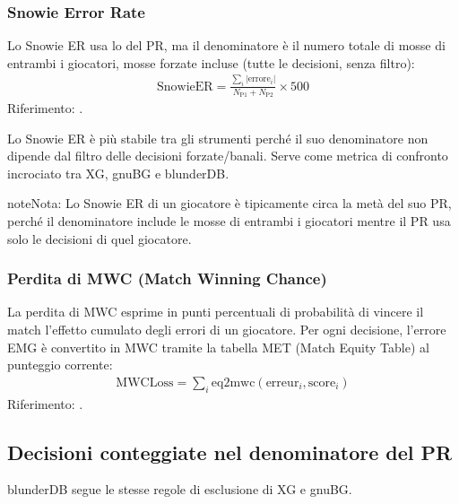 \documentclass[letterpaper,10pt,italian]{sphinxmanual}
\begin{document}
\subsubsection{Snowie Error Rate}
\label{\detokenize{stats_parity:snowie-error-rate}}
\sphinxAtStartPar
Lo Snowie ER usa lo  del PR, ma il denominatore è il numero totale di mosse di entrambi i giocatori, mosse forzate incluse (tutte le decisioni, senza filtro):
\begin{equation*}
\begin{split}\mathrm{SnowieER} = \frac{\sum_i |\mathrm{errore}_i|}{N_\text{P1} + N_\text{P2}} \times 500\end{split}
\end{equation*}
\sphinxAtStartPar
Riferimento: .

\sphinxAtStartPar
Lo Snowie ER è più stabile tra gli strumenti perché il suo denominatore non dipende dal filtro delle decisioni forzate/banali. Serve come metrica di confronto incrociato tra XG, gnuBG e blunderDB.

\begin{sphinxadmonition}{note}{Nota:}
\sphinxAtStartPar
Lo Snowie ER di un giocatore è tipicamente circa la metà del suo PR, perché il denominatore include le mosse di entrambi i giocatori mentre il PR usa solo le decisioni di quel giocatore.
\end{sphinxadmonition}


\subsubsection{Perdita di MWC (Match Winning Chance)}
\label{\detokenize{stats_parity:perte-mwc-match-winning-chance}}
\sphinxAtStartPar
La perdita di MWC esprime in punti percentuali di probabilità di vincere il match l’effetto cumulato degli errori di un giocatore. Per ogni decisione, l’errore EMG è convertito in MWC tramite la tabella MET (Match Equity Table) al punteggio corrente:
\begin{equation*}
\begin{split}\mathrm{MWCLoss} = \sum_i \mathrm{eq2mwc}(\mathrm{erreur}_i, \mathrm{score}_i)\end{split}
\end{equation*}
\sphinxAtStartPar
Riferimento: .


\subsection{Decisioni conteggiate nel denominatore del PR}
\label{\detokenize{stats_parity:decisions-comptees-au-denominateur-du-pr}}
\sphinxAtStartPar
blunderDB segue le stesse regole di esclusione di XG e gnuBG.
\end{document}
